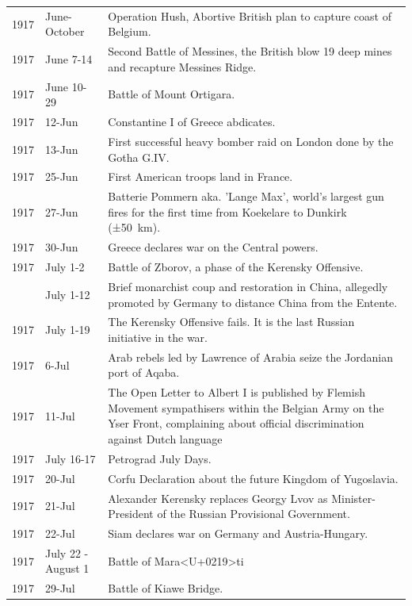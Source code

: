 \documentclass[
  openany]{book}
\begin{document}
\begin{longtable}[t]{rl>{\raggedright\arraybackslash}p{22em}}
\rowcolor{gray!6}  1917 & June-October & Operation Hush, Abortive British plan to capture coast of Belgium.\\
1917 & June 7-14 & Second Battle of Messines, the British blow 19 deep mines and recapture Messines Ridge.\\
\rowcolor{gray!6}  1917 & June 10-29 & Battle of Mount Ortigara.\\
1917 & 12-Jun & Constantine I of Greece abdicates.\\
\addlinespace
\rowcolor{gray!6}  1917 & 13-Jun & First successful heavy bomber raid on London done by the Gotha G.IV.\\
1917 & 25-Jun & First American troops land in France.\\
\rowcolor{gray!6}  1917 & 27-Jun & Batterie Pommern aka. 'Lange Max', world's largest gun fires for the first time from Koekelare to Dunkirk (±50 km).\\
1917 & 30-Jun & Greece declares war on the Central powers.\\
\rowcolor{gray!6}  1917 & July 1-2 & Battle of Zborov, a phase of the Kerensky Offensive.\\
\addlinespace
1917 & July 1-12 & Brief monarchist coup and restoration in China, allegedly promoted by Germany to distance China from the Entente.\\
\rowcolor{gray!6}  1917 & July 1-19 & The Kerensky Offensive fails. It is the last Russian initiative in the war.\\
1917 & 6-Jul & Arab rebels led by Lawrence of Arabia seize the Jordanian port of Aqaba.\\
\rowcolor{gray!6}  1917 & 11-Jul & The Open Letter to Albert I is published by Flemish Movement sympathisers within the Belgian Army on the Yser Front, complaining about official discrimination against Dutch language\\
1917 & July 16-17 & Petrograd July Days.\\
\addlinespace
\rowcolor{gray!6}  1917 & 20-Jul & Corfu Declaration about the future Kingdom of Yugoslavia.\\
1917 & 21-Jul & Alexander Kerensky replaces Georgy Lvov as Minister-President of the Russian Provisional Government.\\
\rowcolor{gray!6}  1917 & 22-Jul & Siam declares war on Germany and Austria-Hungary.\\
1917 & July 22 - August 1 & Battle of Mara<U+0219>ti\\
\rowcolor{gray!6}  1917 & 29-Jul & Battle of Kiawe Bridge.\\

\end{longtable}
\end{document}
